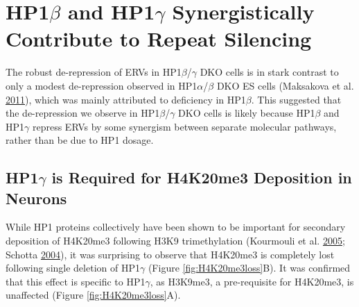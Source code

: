 \documentclass[onehalf,12pt]{beavtex}
\begin{document}
  \FloatBarrier
  
  \section{\texorpdfstring{HP1\(\beta\) and HP1\(\gamma\) Synergistically
  Contribute to Repeat
  Silencing}{HP1\textbackslash{}beta and HP1\textbackslash{}gamma Synergistically Contribute to Repeat Silencing}}\label{hp1beta-and-hp1gamma-synergistically-contribute-to-repeat-silencing}
  
  The robust de-repression of ERVs in HP1\(\beta\)/\(\gamma\) DKO cells is
  in stark contrast to only a modest de-repression observed in
  HP1\(\alpha\)/\(\beta\) DKO ES cells (Maksakova et al.
  \protect\hyperlink{ref-MaksakovaH3K9me3bindingproteinsare2011}{2011}),
  which was mainly attributed to deficiency in HP1\(\beta\). This
  suggested that the de-repression we observe in HP1\(\beta\)/\(\gamma\)
  DKO cells is likely because HP1\(\beta\) and HP1\(\gamma\) repress ERVs
  by some synergism between separate molecular pathways, rather than be
  due to HP1 dosage.
  
  \subsection{\texorpdfstring{HP1\(\gamma\) is Required for H4K20me3
  Deposition in
  Neurons}{HP1\textbackslash{}gamma is Required for H4K20me3 Deposition in Neurons}}\label{hp1gamma-is-required-for-h4k20me3-deposition-in-neurons}
  
  While HP1 proteins collectively have been shown to be important for
  secondary deposition of H4K20me3 following H3K9 trimethylation
  (Kourmouli et al.
  \protect\hyperlink{ref-KourmouliEpigeneticregulationmammalian2005}{2005};
  Schotta
  \protect\hyperlink{ref-Schottasilencingpathwayinduce2004}{2004}), it was
  surprising to observe that H4K20me3 is completely lost following single
  deletion of HP1\(\gamma\) (Figure \ref{fig:H4K20me3loss}B). It was
  confirmed that this effect is specific to HP1\(\gamma\), as H3K9me3, a
  pre-requisite for H4K20me3, is unaffected (Figure
  \ref{fig:H4K20me3loss}A).
  
\end{document}
